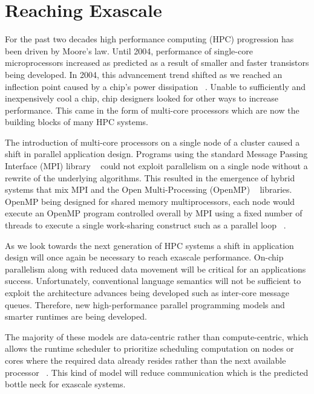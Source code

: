 \section{Reaching Exascale}

For the past two decades high performance computing (HPC) progression
has been driven by Moore's law. Until 2004, performance of single-core
microprocessors increased as predicted as a result of smaller and
faster transistors being developed. In 2004, this advancement trend
shifted as we reached an inflection point caused by a chip’s power
dissipation ~\cite{kogge2013exascale}. Unable to sufficiently and
inexpensively cool a chip, chip designers looked for other ways to
increase performance. This came in the form of multi-core processors
which are now the building blocks of many HPC systems.

The introduction of multi-core processors on a single node of a
cluster caused a shift in parallel application design. Programs using
the standard Message Passing Interface (MPI) library
~\cite{Snir:1998:MCR:552013} could not exploit parallelism on a single
node without a rewrite of the underlying algorithms. This resulted in
the emergence of hybrid systems that mix MPI and the Open
Multi-Processing (OpenMP) ~\cite{openmp08} libraries. OpenMP being
designed for shared memory multiprocessors, each node would execute an
OpenMP program controlled overall by MPI using a fixed number of
threads to execute a single work-sharing construct such as a parallel
loop ~\cite{gropp2013programming}.

As we look towards the next generation of HPC systems a shift in
application design will once again be necessary to reach exascale
performance. On-chip parallelism along with reduced data movement will
be critical for an applications success. Unfortunately, conventional
language semantics will not be sufficient to exploit the architecture
advances being developed such as inter-core message queues. Therefore,
new high-performance parallel programming models and smarter runtimes
are being developed.

The majority of these models are data-centric rather than
compute-centric, which allows the runtime scheduler to prioritize
scheduling computation on nodes or cores where the required data
already resides rather than the next available processor
~\cite{kogge2013exascale}. This kind of model will reduce
communication which is the predicted bottle neck for exascale systems.


